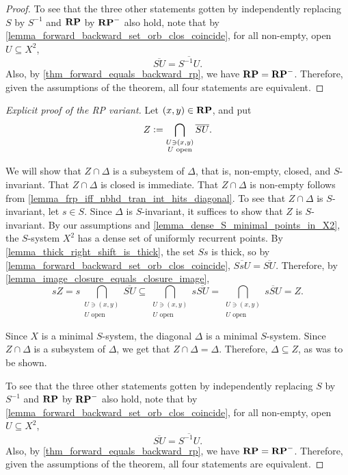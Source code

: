\begin{proof}
    To see that the three other statements gotten by independently replacing $S$ by $S^{-1}$ and $\mathbf{RP}$ by $\mathbf{RP}^-$ also hold, note that by \cref{lemma_forward_backward_set_orb_clos_coincide}, for all non-empty, open $U \subseteq X^2$,
    \[\overline{S U} = \overline{S^{-1}U}.\]
    Also, by \cref{thm_forward_equals_backward_rp}, we have $\mathbf{RP} = \mathbf{RP}^-$.  Therefore, given the assumptions of the theorem, all four statements are equivalent.
\end{proof}

\begin{proof}[Explicit proof of the RP variant]
    Let $(x,y) \in \mathbf{RP}$, and put
    \[Z \vcentcolon= \bigcap_{\substack{U \ni (x,y) \\ U \text{ open}}} \overline{S U}.\]
    
    We will show that $Z \cap \Delta$ is a subsystem of $\Delta$, that is, non-empty, closed, and $S$-invariant. That $Z \cap \Delta$ is closed is immediate. That $Z \cap \Delta$ is non-empty follows from \cref{lemma_frp_iff_nbhd_tran_int_hits_diagonal}.
    To see that $Z \cap \Delta$ is $S$-invariant, let $s \in S$.  Since $\Delta$ is $S$-invariant, it suffices to show that $Z$ is $S$-invariant. By our assumptions and \cref{lemma_dense_S_minimal_points_in_X2}, the $S$-system $X^2$ has a dense set of uniformly recurrent points.  By \cref{lemma_thick_right_shift_is_thick}, the set $Ss$ is thick, so by \cref{lemma_forward_backward_set_orb_clos_coincide}, $\overline{SsU} = \overline{SU}$. Therefore, by \cref{lemma_image_closure_equals_closure_image},
    \[
        sZ = s\bigcap_{\substack{U \ni (x,y) \\ U \text{ open}}} \overline{S U} \subseteq \bigcap_{\substack{U \ni (x,y) \\ U \text{ open}}} s \overline{S U} = \bigcap_{\substack{U \ni (x,y) \\ U \text{ open}}} \overline{sS U} = Z.
    \]

    Since $X$ is a minimal $S$-system, the diagonal $\Delta$ is a minimal $S$-system. Since $Z \cap \Delta$ is a subsystem of $\Delta$, we get that $Z \cap \Delta = \Delta$. Therefore, $\Delta \subseteq Z$, as was to be shown.

    To see that the three other statements gotten by independently replacing $S$ by $S^{-1}$ and $\mathbf{RP}$ by $\mathbf{RP}^-$ also hold, note that by \cref{lemma_forward_backward_set_orb_clos_coincide}, for all non-empty, open $U \subseteq X^2$,
    \[\overline{S U} = \overline{S^{-1}U}.\]
    Also, by \cref{thm_forward_equals_backward_rp}, we have $\mathbf{RP} = \mathbf{RP}^-$.  Therefore, given the assumptions of the theorem, all four statements are equivalent.
\end{proof}


